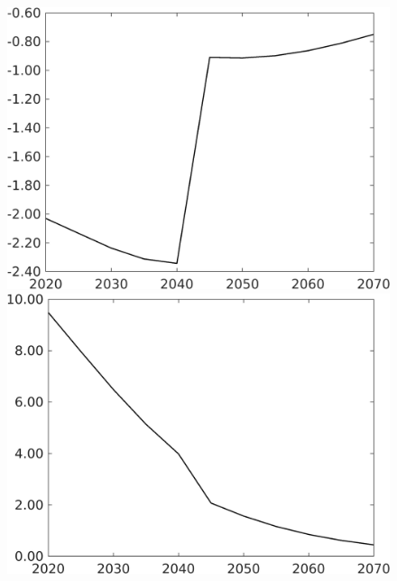 \documentclass[12pt]{article}
\begin{document}
\begin{figure}[h!!]
\begin{minipage}[]{0.32\textwidth}
	\end{minipage}		
	\begin{minipage}[]{0.32\textwidth}
		\includegraphics[width=1\textwidth]{../../codding_model/own_basedOnFried/optimalPol_010922_revision/figures/all_13Sept22/CompTaufPER_bytaul_Equlab_Reg0_gAg_spillover0_nsk0_xgr0_knspil1_sep0_LFlimit1_emsbase0_countec0_GovRev0_etaa0.79_lgd0.png}
	\end{minipage}
	\begin{minipage}[]{0.32\textwidth}
		\includegraphics[width=1\textwidth]{../../codding_model/own_basedOnFried/optimalPol_010922_revision/figures/all_13Sept22/CompTaufPER_bytaul_Equlab_Reg0_gAn_spillover0_nsk0_xgr0_knspil1_sep0_LFlimit1_emsbase0_countec0_GovRev0_etaa0.79_lgd0.png}

\end{minipage}
\end{figure}
\end{document}
